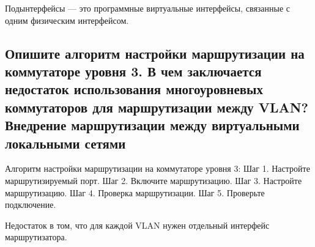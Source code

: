 Подынтерфейсы — это программные виртуальные интерфейсы,
связанные с одним физическим интерфейсом.


\subsection{Опишите алгоритм настройки маршрутизации на коммутаторе уровня 3.
В чем заключается недостаток использования многоуровневых коммутаторов для маршрутизации между VLAN?
Внедрение маршрутизации между виртуальными локальными сетями }

Алгоритм настройки маршрутизации на коммутаторе уровня 3:
Шаг 1. Настройте маршрутизируемый порт.
Шаг 2. Включите маршрутизацию.
Шаг 3. Настройте маршрутизацию.
Шаг 4. Проверка маршрутизации.
Шаг 5. Проверьте подключение.

Недостаток в том, что для каждой VLAN нужен отдельный интерфейс
маршрутизатора.

